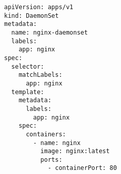 \begin{verbatim}
apiVersion: apps/v1
kind: DaemonSet
metadata:
  name: nginx-daemonset
  labels:
    app: nginx
spec:
  selector:
    matchLabels:
      app: nginx
  template:
    metadata:
      labels:
        app: nginx
    spec:
      containers:
        - name: nginx
          image: nginx:latest
          ports:
            - containerPort: 80
\end{verbatim}